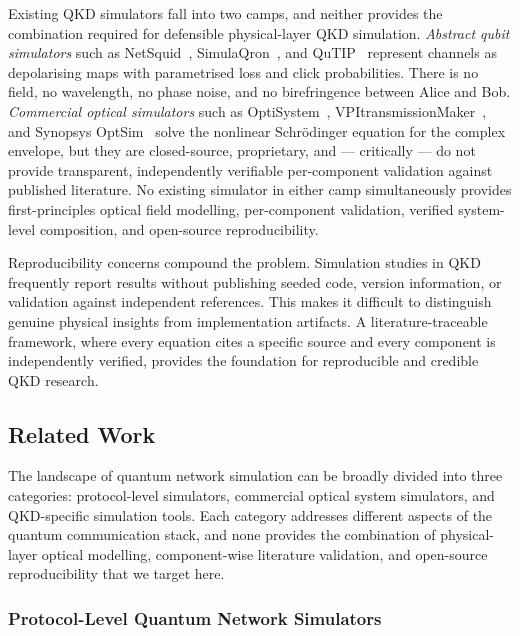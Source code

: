 \documentclass[3p,times,preprint]{elsarticle}
\begin{document}
Existing QKD simulators fall into two camps, and neither provides the
combination required for defensible physical-layer QKD simulation.
\emph{Abstract qubit simulators} such as NetSquid~\cite{netSquid},
SimulaQron~\cite{simulaqron}, and QuTIP~\cite{qutip} represent channels
as depolarising maps with parametrised loss and click probabilities.
There is no field, no wavelength, no phase noise, and no birefringence
between Alice and Bob.  \emph{Commercial optical simulators} such as
OptiSystem~\cite{optisystem}, VPItransmissionMaker~\cite{vpiphotonics},
and Synopsys OptSim~\cite{optsim} solve the nonlinear Schr\"odinger
equation for the complex envelope, but they are closed-source,
proprietary, and --- critically --- do not provide transparent,
independently verifiable per-component validation against published
literature.  No existing simulator in either camp simultaneously
provides first-principles optical field modelling, per-component
validation, verified system-level composition, and open-source
reproducibility.

Reproducibility concerns compound the problem.  Simulation studies in
QKD frequently report results without publishing seeded code, version
information, or validation against independent references.  This makes
it difficult to distinguish genuine physical insights from implementation
artifacts.  A literature-traceable framework, where every equation cites
a specific source and every component is independently verified, provides
the foundation for reproducible and credible QKD research.

\subsection{Related Work}

The landscape of quantum network simulation can be broadly divided into
three categories: protocol-level simulators, commercial optical system
simulators, and QKD-specific simulation tools.  Each category addresses
different aspects of the quantum communication stack, and none provides
the combination of physical-layer optical modelling, component-wise
literature validation, and open-source reproducibility that we target here.

\subsubsection{Protocol-Level Quantum Network Simulators}
\end{document}
